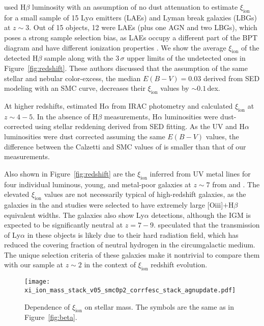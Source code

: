 \documentclass[iop]{emulateapj}
\newcommand{\xiion}{\ensuremath{\xi_{\mathrm{ion}}}}
\newcommand{\halpha}{H\ensuremath{\alpha}}
\newcommand{\hbeta}{H\ensuremath{\beta}}
\begin{document}
\citet{nakajima16} used {\hbeta} luminosity with an assumption of no dust attenuation to estimate {\xiion} for a small sample of 15 Ly$\alpha$ emitters (LAEs) and Lyman break galaxies (LBGs) at $z\sim 3$. Out of 15 objects, 12 were LAEs (plus one AGN and two LBGs), which poses a strong sample selection bias, as LAEs occupy a different part of the BPT diagram and have different ionization properties \citep[e.g.,][]{nakajima13,erb16}.
We show the average {\xiion} of the detected {\hbeta} sample along with the $3\,\sigma$ upper limits of the undetected ones in Figure~\ref{fig:redshift}. These authors discussed that the assumption of the same stellar and nebular color-excess, the median $E(B-V)=0.03$ derived from SED modeling with an SMC curve, decreases their ${\xiion}$ values by $\sim 0.1$\,dex. 

At higher redshifts, \citet{bouwens16b} estimated {\halpha} from IRAC photometry and calculated {\xiion} at $z\sim 4-5$. In the absence of {\hbeta} measurements, {\halpha} luminosities were dust-corrected using stellar reddening derived from SED fitting. As the UV and {\halpha} luminosities were dust corrected assuming the same $E(B-V)$ values, the difference between the Calzetti and SMC values of \citet{bouwens16b} is smaller than that of our measurements.

Also shown in Figure~\ref{fig:redshift} are the {\xiion} inferred from UV metal lines for four individual luminous,
young, and metal-poor galaxies at $z\sim 7$ from \citet{stark15} and \citet{stark17}.
The elevated {\xiion} values are not necessarily typical of high-redshift galaxies, as the galaxies in the \citet{stark15} and \citet{stark17} studies were selected to have extremely large [O{\sc iii}]$+${\hbeta} equivalent widths. The galaxies also show Ly$\alpha$ detections, although the IGM is expected to be significantly neutral at $z=7-9$. \citet{stark17} speculated that the transmission of Ly$\alpha$ in these objects is likely due to their hard radiation field, which has reduced the covering fraction of neutral hydrogen in the circumgalactic medium. The unique selection criteria of these galaxies make it nontrivial to compare them with our sample at $z\sim 2$ in the context of {\xiion} redshift evolution.

\begin{figure}[tbp]
	\centering
		\texttt{[image: xi\_ion\_mass\_stack\_v05\_smc0p2\_corrfesc\_stack\_agnupdate.pdf]}
		\caption{Dependence of {\xiion} on stellar mass.
		The symbols are the same as in Figure~\ref{fig:beta}.
		}
		\label{fig:mass}
\end{figure}
\end{document}
